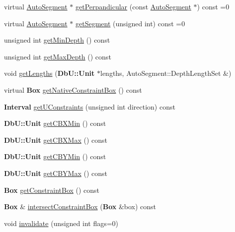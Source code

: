 \begin{DoxyCompactItemize}
\item 
virtual \hyperlink{classKatabatic_1_1AutoSegment}{Auto\-Segment} $\ast$ \hyperlink{classKatabatic_1_1AutoContact_a994371005874f946cc0ac78005d38423}{get\-Perpandicular} (const \hyperlink{classKatabatic_1_1AutoSegment}{Auto\-Segment} $\ast$) const =0
\item 
virtual \hyperlink{classKatabatic_1_1AutoSegment}{Auto\-Segment} $\ast$ \hyperlink{classKatabatic_1_1AutoContact_a50531ded68cc5206fe104b8d8bf3bd87}{get\-Segment} (unsigned int) const =0
\item 
unsigned int \hyperlink{classKatabatic_1_1AutoContact_a5b16a639914ac05e0cb7032f918278b0}{get\-Min\-Depth} () const 
\item 
unsigned int \hyperlink{classKatabatic_1_1AutoContact_a625d8d6b12c514f8cf1bc217cc20d743}{get\-Max\-Depth} () const 
\item 
void \hyperlink{classKatabatic_1_1AutoContact_ac607a624c0698056c5bccf405cf05ea7}{get\-Lengths} ({\bf Db\-U\-::\-Unit} $\ast$lengths, Auto\-Segment\-::\-Depth\-Length\-Set \&)
\item 
virtual {\bf Box} \hyperlink{classKatabatic_1_1AutoContact_a762d33db26927e6db939a7420bb95743}{get\-Native\-Constraint\-Box} () const 
\item 
{\bf Interval} \hyperlink{classKatabatic_1_1AutoContact_aaa2758181c73fb81e43550dea6b03041}{get\-U\-Constraints} (unsigned int direction) const 
\item 
{\bf Db\-U\-::\-Unit} \hyperlink{classKatabatic_1_1AutoContact_a0c391297a64d0ae15c14a6e803b0316e}{get\-C\-B\-X\-Min} () const 
\item 
{\bf Db\-U\-::\-Unit} \hyperlink{classKatabatic_1_1AutoContact_a20ab0da1716ecd002f3abc76285dd5a1}{get\-C\-B\-X\-Max} () const 
\item 
{\bf Db\-U\-::\-Unit} \hyperlink{classKatabatic_1_1AutoContact_acd040eea296d73195a2065819ba02ebc}{get\-C\-B\-Y\-Min} () const 
\item 
{\bf Db\-U\-::\-Unit} \hyperlink{classKatabatic_1_1AutoContact_a25bae06d071e2e19696d3e950956d785}{get\-C\-B\-Y\-Max} () const 
\item 
{\bf Box} \hyperlink{classKatabatic_1_1AutoContact_a0d59519da5ced04bca8f2849c9f9a890}{get\-Constraint\-Box} () const 
\item 
{\bf Box} \& \hyperlink{classKatabatic_1_1AutoContact_a2b4fffa1c238d8379a3418012e4f60f0}{intersect\-Constraint\-Box} ({\bf Box} \&box) const 
\item 
void \hyperlink{classKatabatic_1_1AutoContact_aabac50fd9b8e1bba7289573973658d18}{invalidate} (unsigned int flags=0)

\end{DoxyCompactItemize}
